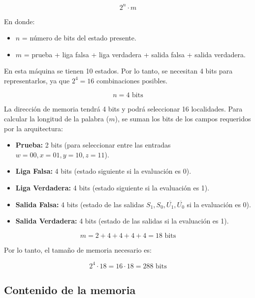 \documentclass[12pt, letterpaper]{article}
\begin{document}
\[
2^n \cdot m
\]

En donde:
\begin{itemize}
    \item $n$ = número de bits del estado presente.
    \item $m$ = prueba + liga falsa + liga verdadera + salida falsa + salida verdadera.
\end{itemize}

En esta máquina se tienen 10 estados. Por lo tanto, se necesitan 4 bits para representarlos, ya que $2^4=16$ combinaciones posibles.

\[
n = 4\text{ bits}
\]

La dirección de memoria tendrá 4 bits y podrá seleccionar 16 localidades. Para calcular la longitud de la palabra ($m$), se suman los bits de los campos requeridos por la arquitectura:

\begin{itemize}
    \item \textbf{Prueba:} 2 bits (para seleccionar entre las entradas $w=00, x=01, y=10, z=11$).
    \item \textbf{Liga Falsa:} 4 bits (estado siguiente si la evaluación es 0).
    \item \textbf{Liga Verdadera:} 4 bits (estado siguiente si la evaluación es 1).
    \item \textbf{Salida Falsa:} 4 bits (estado de las salidas $S_1, S_0, \overline{U_1}, \overline{U_0}$ si la evaluación es 0).
    \item \textbf{Salida Verdadera:} 4 bits (estado de las salidas si la evaluación es 1).
\end{itemize}

\[
m = 2 + 4 + 4 + 4 + 4 = 18\text{ bits}
\]

Por lo tanto, el tamaño de memoria necesario es:

\begin{tcolorbox}[colback=gray!20,colframe=LimeGreen!75!black]
\[
2^4\cdot 18 = 16\cdot 18 = 288\text{ bits}
\]
\end{tcolorbox}

\subsection*{Contenido de la memoria}
\end{document}
